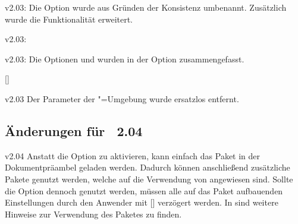 \begin{Obsolete}{v2.03:}{}
\printobsoletelist%
%
Die Option  wurde aus Gründen der Konsistenz umbenannt. 
Zusätzlich wurde die Funktionalität erweitert.
\end{Obsolete}

\begin{Obsolete}{v2.03:}{}
\begin{Obsolete}{v2.03:}{}
\printobsoletelist%
%
Die Optionen  und  wurden in der Option 
 zusammengefasst.
\end{Obsolete}
\end{Obsolete}

\begin{Obsolete}{}{[]}
\begin{Obsolete}{v2.03}{}
\printobsoletelist%
%
Der Parameter  der 
"=Umgebung wurde ersatzlos entfernt.
\end{Obsolete}
\end{Obsolete}


%
\subsection{Änderungen für \TUDScript~2.04}
\begin{Obsolete}{v2.04}{}%
\printobsoletelist%
%
Anstatt die Option  zu aktivieren, kann einfach das Paket 
 in der Dokumentpräambel geladen werden. Dadurch können 
anschließend zusätzliche Pakete genutzt werden, welche auf die Verwendung von 
 angewiesen sind. Sollte die Option  
dennoch genutzt werden, müssen alle auf das Paket  
aufbauenden Einstellungen durch den Anwender mit 
[\PParameter{\dots}] 
verzögert werden. In  sind weitere Hinweise zur 
Verwendung des Paketes  zu finden.
\end{Obsolete}


%
